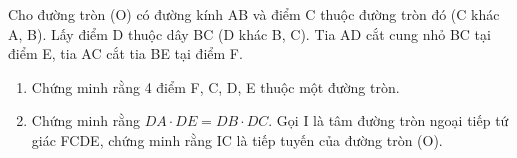 \begin{ex}
Cho đường tròn (O) có đường kính AB và điểm C thuộc đường tròn đó (C khác A, B). Lấy điểm D thuộc dây BC (D khác B, C). Tia AD cắt cung nhỏ BC tại điểm E, tia AC cắt tia BE tại điểm F.
	\begin{enumerate}
		\item[a)] Chứng minh rằng 4 điểm F, C, D, E thuộc một đường tròn.
		\item[b)] Chứng minh rằng $DA \cdot DE = DB \cdot DC$. Gọi I là tâm đường tròn ngoại tiếp tứ giác FCDE, chứng minh rằng IC là tiếp tuyến của đường tròn (O).
	\end{enumerate}
\end{ex}
